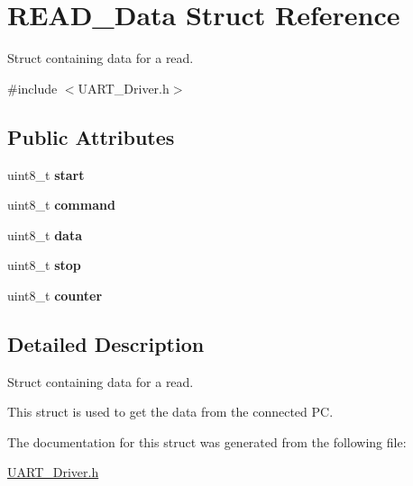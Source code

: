 \hypertarget{structREAD__Data}{\section{R\+E\+A\+D\+\_\+\+Data Struct Reference}
\label{structREAD__Data}
}


Struct containing data for a read.  




{\ttfamily \#include $<$U\+A\+R\+T\+\_\+\+Driver.\+h$>$}

\subsection*{Public Attributes}
\begin{DoxyCompactItemize}
\item 
\hypertarget{structREAD__Data_abd7f404c68cf5582c2770b8dcd47aab2}{uint8\+\_\+t {\bfseries start}}\label{structREAD__Data_abd7f404c68cf5582c2770b8dcd47aab2}

\item 
\hypertarget{structREAD__Data_ae3ff6a3b1c7520ec36800d84dca6e479}{uint8\+\_\+t {\bfseries command}}\label{structREAD__Data_ae3ff6a3b1c7520ec36800d84dca6e479}

\item 
\hypertarget{structREAD__Data_a63657ac12432dfec84b49c304017325e}{uint8\+\_\+t {\bfseries data}}\label{structREAD__Data_a63657ac12432dfec84b49c304017325e}

\item 
\hypertarget{structREAD__Data_ae7beddc26b85817beb7228366bf73a63}{uint8\+\_\+t {\bfseries stop}}\label{structREAD__Data_ae7beddc26b85817beb7228366bf73a63}

\item 
\hypertarget{structREAD__Data_af469ae3a289778a3104030f67ea29e40}{uint8\+\_\+t {\bfseries counter}}\label{structREAD__Data_af469ae3a289778a3104030f67ea29e40}

\end{DoxyCompactItemize}


\subsection{Detailed Description}
Struct containing data for a read. 

This struct is used to get the data from the connected P\+C. 

The documentation for this struct was generated from the following file\+:\begin{DoxyCompactItemize}
\item 
\hyperlink{UART__Driver_8h}{U\+A\+R\+T\+\_\+\+Driver.\+h}\end{DoxyCompactItemize}
